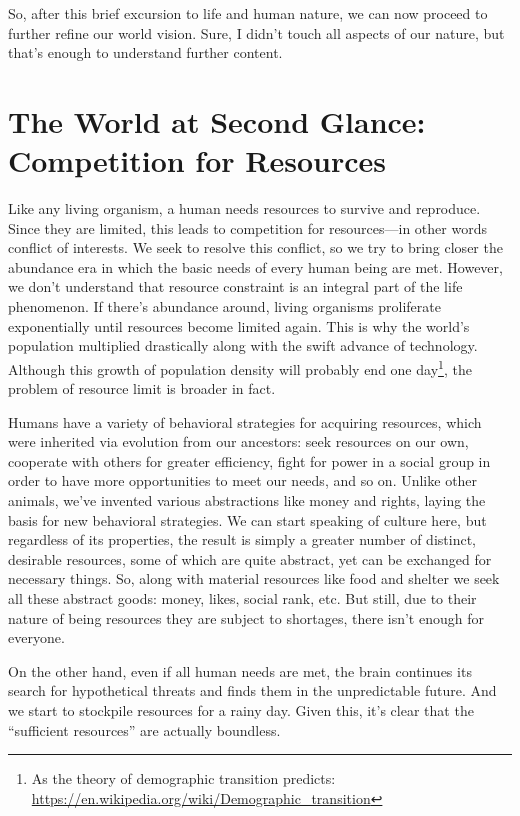\documentclass[12pt]{report}
\begin{document}
\noindent So, after this brief excursion to life and human nature, we can now proceed to further refine our world vision. Sure, I didn’t touch all aspects of our nature, but that’s enough to understand further content.

\section*{The World at Second Glance: Competition for Resources}

Like any living organism, a human needs resources to survive and reproduce. Since they are limited, this leads to competition for resources\thinspace---\thinspace in other words conflict of interests. We seek to resolve this conflict, so we try to bring closer the abundance era in which the basic needs of every human being are met. However, we don’t understand that resource constraint is an integral part of the life phenomenon. If there’s abundance around, living organisms proliferate exponentially until resources become limited again. This is why the world’s population multiplied drastically along with the swift advance of technology. Although this growth of population density will probably end one day\footnote{As the theory of demographic transition predicts: \url{https://en.wikipedia.org/wiki/Demographic_transition}}, the problem of resource limit is broader in fact.

\noindent Humans have a variety of behavioral strategies for acquiring resources, which were inherited via evolution from our ancestors: seek resources on our own, cooperate with others for greater efficiency, fight for power in a social group in order to have more opportunities to meet our needs, and so on. Unlike other animals, we’ve invented various abstractions like money and rights, laying the basis for new behavioral strategies. We can start speaking of culture here, but regardless of its properties, the result is simply a greater number of distinct, desirable resources, some of which are quite abstract, yet can be exchanged for necessary things. So, along with material resources like food and shelter we seek all these abstract goods: money, likes, social rank, etc. But still, due to their nature of being resources they are subject to shortages, there isn’t enough for everyone.

\noindent On the other hand, even if all human needs are met, the brain continues its search for hypothetical threats and finds them in the unpredictable future. And we start to stockpile resources for a rainy day. Given this, it’s clear that the ``sufficient resources'' are actually boundless.
\end{document}
